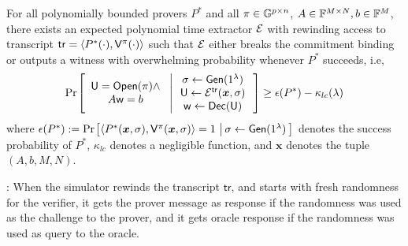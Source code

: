 
\begin{lemma}[Soundness]\label{lem:linercheck_sound}
For all polynomially bounded provers $P^\ast$ and all $\pi\in \mathbb{G}^{p\times n}$,
$A\in \mathbb{F}^{M\times N}, b\in \mathbb{F}^M$, there exists an expected polynomial time
extractor $\mathcal{E}$ with rewinding access to transcript $\mathsf{tr}=\langle
P^\ast(\cdot),\mathsf{V}^\pi(\cdot)\rangle$ such that $\mathcal{E}$ either breaks the 
commitment binding or outputs a witness with overwhelming probability whenever 
$P^\ast$ succeeds, i.e,
{\small
\begin{align*}
\condprob{\begin{array}{c}
\ewit=\open(\pi)\wedge \\
A\wit=b
\end{array}
}{
\begin{array}{c}
\sigma\gets \gen(\secparam) \\
\ewit\gets \extr^{\mathsf{tr}}(\bm{x},\sigma) \\
\wit\gets \dec(\ewit)
\end{array}}\geq
\epsilon(P^\ast)-\kappa_{lc}(\secpar)
\end{align*}
}
where $\epsilon(P^\ast):= \condprob{\langle P^\ast(\bm{x},\sigma),\verifier^\pi(\bm{x},\sigma)\rangle=1}{\sigma\gets \gen(\secparam)}$ denotes the success probability of $P^\ast$, $\kappa_{lc}$ denotes a negligible function, and $\bm{x}$ denotes the tuple $(A,b,M,N)$.
\end{lemma}

: When the simulator rewinds the transcript $\mathsf{tr}$,
and starts with fresh randomness for the verifier, it gets the prover message as
response if the randomness was used as the challenge to the prover, and it gets
oracle response if the randomness was used as query to the oracle.

